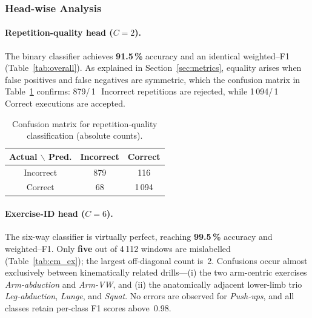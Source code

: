 \documentclass{article}
\begin{document}
\begin{enumerate}[label=\textbf{\Alph*.}, leftmargin=2em, itemsep=6pt]
\subsubsection{Head-wise Analysis}

\paragraph{Repetition-quality head ($C\!=\!2$).}
The binary classifier achieves \textbf{91.5\,\%} accuracy and an
identical weighted–F1 (Table~\ref{tab:overall}).  As explained in
Section~\ref{sec:metrics}, equality arises when false positives and false
negatives are symmetric, which the confusion matrix in
Table~\ref{tab:cm_rep} confirms: 879/\,1\,\, Incorrect
repetitions are rejected, while 1\,094/\,1\,\, Correct
executions are accepted.

\begin{table}[h]
  \centering\small
  \caption{Confusion matrix for repetition-quality classification
           (absolute counts).}
  \label{tab:cm_rep}
  \begin{tabular}{@{}c|cc@{}}
    \toprule
    \textbf{Actual $\backslash$ Pred.} & \textbf{Incorrect} & \textbf{Correct} \\
    \midrule
    Incorrect & 879 & 116 \\
    Correct   &  68 & 1\,094 \\
    \bottomrule
  \end{tabular}
\end{table}

\paragraph{Exercise-ID head ($C\!=\!6$).}
The six-way classifier is virtually perfect, reaching
\textbf{99.5\,\%} accuracy and weighted–F1.  Only \textbf{five} out of
4\,112 windows are mislabelled (Table~\ref{tab:cm_ex}); the largest
off-diagonal count is~2.  Confusions occur almost exclusively between
kinematically related drills—(i) the two arm-centric exercises
\emph{Arm-abduction} and \emph{Arm-VW}, and (ii) the anatomically
adjacent lower-limb trio \emph{Leg-abduction}, \emph{Lunge}, and
\emph{Squat}.  No errors are observed for \emph{Push-ups}, and all
classes retain per-class F1 scores above~0.98.


\end{enumerate}
\end{document}
